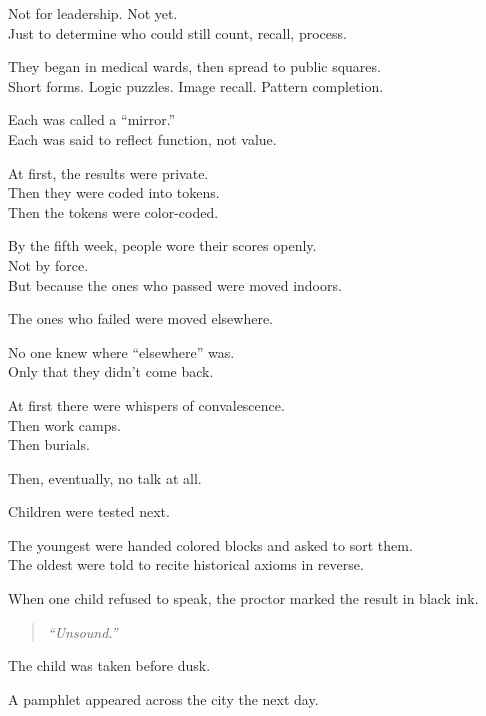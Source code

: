 \documentclass[12pt]{article}
\begin{document}
Not for leadership. Not yet.\\
Just to determine who could still count, recall, process.

They began in medical wards, then spread to public squares.\\
Short forms. Logic puzzles. Image recall. Pattern completion.

Each was called a “mirror.”\\
Each was said to reflect function, not value.

\vspace{1em}

At first, the results were private.\\
Then they were coded into tokens.\\
Then the tokens were color-coded.

By the fifth week, people wore their scores openly.\\
Not by force.\\
But because the ones who passed were moved indoors.

The ones who failed were moved elsewhere.

\vspace{1em}

No one knew where “elsewhere” was.\\
Only that they didn’t come back.

At first there were whispers of convalescence.\\
Then work camps.\\
Then burials.

Then, eventually, no talk at all.

\vspace{1em}

Children were tested next.

The youngest were handed colored blocks and asked to sort them.\\
The oldest were told to recite historical axioms in reverse.

When one child refused to speak, the proctor marked the result in black ink.

\begin{quote}
\textit{“Unsound.”}
\end{quote}

The child was taken before dusk.

\vspace{1em}

A pamphlet appeared across the city the next day.
\end{document}
